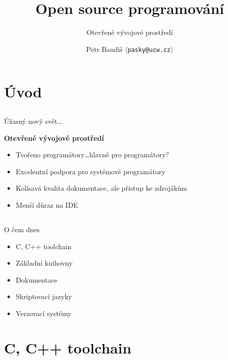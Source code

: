 \documentclass{beamer}
\begin{document}

\title{Open source programování}
\subtitle{Otevřené vývojové prostředí}
\author{Petr Baudiš $\langle${\tt pasky@ucw.cz}$\rangle$}
\date{}
\frame{\titlepage}

\section{Úvod}

\subsection{}
\begin{frame}{Úžasný nový svět\dots}
\begin{center}
{\bf Otevřené vývojové prostředí}
\end{center}
\begin{itemize}
\item Tvořeno programátory\dots hlavně pro programátory?
\item Excelentní podpora pro systémové programátory
\item Kolísavá kvalita dokumentace, ale přístup ke zdrojákům
\item Menší důraz na IDE
\end{itemize}
\end{frame}

\subsection{}
\begin{frame}{O čem dnes}
\begin{itemize}
\item C, C++ toolchain
\item Základní knihovny
\item Dokumentace
\item Skriptovací jazyky
\item Verzovací systémy
\end{itemize}
\end{frame}


\section{C, C++ toolchain}
\end{document}
